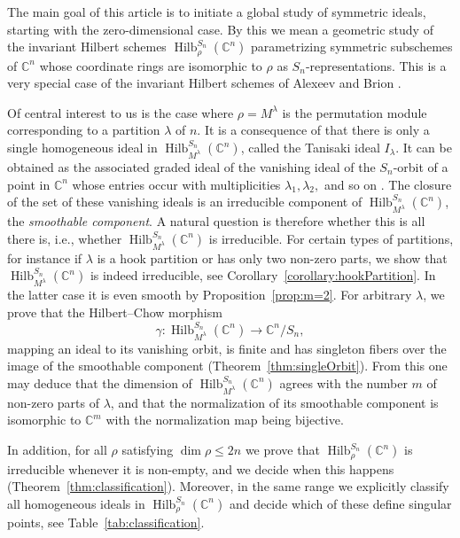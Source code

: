 \documentclass[11pt]{amsart}
\theoremstyle{definition}
\newcommand{\CC}{\mathbb{C}}
\DeclareMathOperator{\Hilb}{Hilb}
\begin{document}
The main goal of this article is to initiate a global study of symmetric ideals, starting with the zero-dimensional case. By this we mean a geometric study of the invariant Hilbert schemes $\Hilb_{\rho}^{S_n}(\CC^n)$ parametrizing symmetric subschemes of $\CC^n$ whose coordinate rings are isomorphic to $\rho$ as $S_n$-representations. This is a very special case of the invariant Hilbert schemes of Alexeev and Brion \cite{AlexeevBrion,BrionInvariantHilb}.

Of central interest to us is the case where $\rho = M^\lambda$ is the permutation module corresponding to a partition $\lambda$ of $n$. It is a consequence of \cite{BergeronGarsia1992Harmonic} that there is only a single homogeneous ideal in $\Hilb_{M^\lambda}^{S_n}(\CC^n)$, called the Tanisaki ideal $I_\lambda$. It can be obtained as the associated graded ideal of the vanishing ideal of the $S_n$-orbit of a point in $\CC^n$ whose entries occur with multiplicities $\lambda_1, \lambda_2,$ and so on \cite{GarsiaProcesi1992}. The closure of the set of these vanishing ideals is an irreducible component of $\Hilb_{M^\lambda}^{S_n}(\CC^n)$, the \emph{smoothable component}. A natural question is therefore whether this is all there is, i.e., whether $\Hilb_{M^\lambda}^{S_n}(\CC^n)$ is irreducible. For certain types of partitions, for instance if $\lambda$ is a hook partition or has only two non-zero parts, we show that $\Hilb_{M^\lambda}^{S_n}(\CC^n)$ is indeed irreducible, see Corollary~\ref{corollary:hookPartition}. In the latter case it is even smooth by Proposition~\ref{prop:m=2}. For arbitrary $\lambda$, we prove that the Hilbert--Chow morphism
\begin{equation*}
    \gamma \colon \Hilb_{M^\lambda}^{S_n}(\CC^n) \longrightarrow \CC^n/S_n,
\end{equation*}
mapping an ideal to its vanishing orbit, is finite and has singleton fibers over the image of the smoothable component (Theorem~\ref{thm:singleOrbit}). From this one may deduce that the dimension of $\Hilb_{M^\lambda}^{S_n}(\CC^n)$ agrees with the number $m$ of non-zero parts of $\lambda$, and that the normalization of its smoothable component is isomorphic to $\CC^m$ with the normalization map being bijective.

In addition, for all $\rho$ satisfying $\dim \rho \leq 2n$ we prove that $\Hilb_\rho^{S_n}(\CC^n)$ is irreducible whenever it is non-empty, and we decide when this happens (Theorem~\ref{thm:classification}). Moreover, in the same range we explicitly classify all homogeneous ideals in $\Hilb_\rho^{S_n}(\CC^n)$ and decide which of these define singular points, see Table~\ref{tab:classification}.
\end{document}
